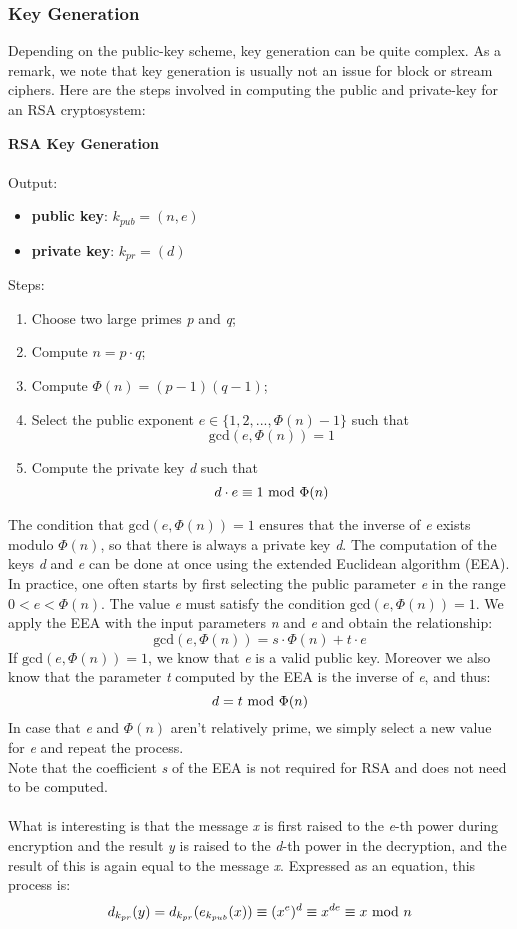 \newpage
\subsubsection{Key Generation}
Depending on the public-key scheme, key generation can be quite complex. As a remark, we note that key generation is usually not an issue for block or stream ciphers. Here are the steps involved in computing the public and private-key for an RSA cryptosystem:
\begin{framed}
    \hfill\break\textbf{RSA Key Generation}\\\\
    Output:
    \begin{itemize}
        \item \textbf{public key}: $k_{pub}=(n,e)$
        \item \textbf{private key}: $k_{pr}=(d)$
    \end{itemize}
    Steps:
    \begin{enumerate}
        \item Choose two large primes \textit{p} and \textit{q};
        \item Compute $n=p\cdot q$;
        \item Compute $\Phi(n)=(p-1)(q-1)$;
        \item Select the public exponent $e\in\{1,2,...,\Phi(n)-1\}$ such that
        $$\text{gcd}(e,\Phi(n))=1$$
        \item Compute the private key \textit{d} such that
        $$d\cdot e\equiv1\text{ mod }\Phi(n)$$
    \end{enumerate}
\end{framed}
The condition that $\text{gcd}(e,\Phi(n))=1$ ensures that the inverse of \textit{e} exists modulo $\Phi(n)$, so that there is always a private key \textit{d}. The computation of the keys \textit{d} and \textit{e} can be done at once using the extended Euclidean algorithm (EEA). In practice, one often starts by first selecting the public parameter \textit{e} in the range $0<e<\Phi(n)$. The value \textit{e} must satisfy the condition $\text{gcd}(e,\Phi(n))=1$. We apply the EEA with the input parameters \textit{n} and \textit{e} and obtain the relationship:
$$\text{gcd}(e,\Phi(n))=s\cdot\Phi(n)+t\cdot e$$
If $\text{gcd}(e,\Phi(n))=1$, we know that \textit{e} is a valid public key. Moreover we also know that the parameter \textit{t} computed by the EEA is the inverse of \textit{e}, and thus:
$$d=t\text{ mod }\Phi(n)$$
In case that \textit{e} and $\Phi(n)$ aren't relatively prime, we simply select a new value for \textit{e} and repeat the process.\\Note that the coefficient \textit{s} of the EEA is not required for RSA and does not need to be computed.\\\\
What is interesting is that the message \textit{x} is first raised to the \textit{e}-th power during encryption and the result \textit{y} is raised to the \textit{d}-th power  in the decryption, and the result of this is again equal to the message \textit{x}. Expressed as an equation, this process is:
$$d_{k_{pr}}(y)=d_{k_{pr}}(e_{k_{pub}}(x))\equiv (x^e)^d\equiv x^{de}\equiv x\text{ mod } n$$

